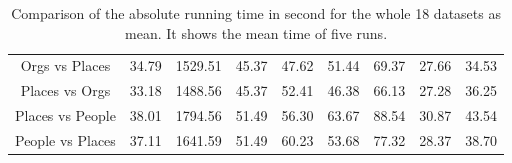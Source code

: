 \begin{table}[]
{\begin{tabular}{@{}ccccccccc@{}}
			Orgs vs Places        & 34.79 & 1529.51 & 45.37    & 47.62          & 51.44 & 69.37  & 27.66 & 34.53 \\
			Places vs Orgs        & 33.18 & 1488.56 & 45.37    & 52.41          & 46.38 & 66.13  & 27.28 & 36.25 \\
			Places vs People      & 38.01 & 1794.56 & 51.49    & 56.30          & 63.67 & 88.54  & 30.87 & 43.54 \\
			People vs Places      & 37.11 & 1641.59 & 51.49    & 60.23          & 53.68 & 77.32  & 28.37 & 38.70 \\ \bottomrule
	\end{tabular}}
	\caption[Time Comparison on Whole Dataset]{Comparison of the absolute running time in second for the whole 18 datasets as mean. It shows the mean time of five runs.\label{BTableCompleteTime}}
\end{table}

